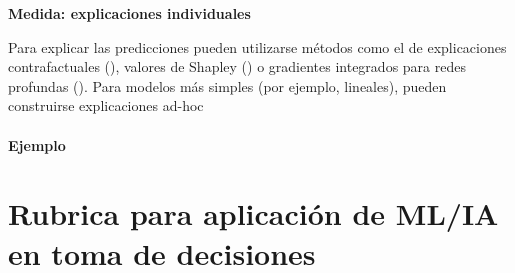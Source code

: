 \documentclass[
]{book}
\let\BeginKnitrBlock\begin \let\EndKnitrBlock\end
\begin{document}
\BeginKnitrBlock{rmdtip}
\textbf{Medida: explicaciones individuales}

Para explicar las predicciones pueden utilizarse métodos como el de explicaciones contrafactuales (\citep{wachter}),
valores de Shapley (\citep{shapley}) o gradientes integrados para redes profundas (\citep{gradient}).
Para modelos más simples (por ejemplo, lineales), pueden construirse explicaciones ad-hoc
\EndKnitrBlock{rmdtip}

\hypertarget{ejemplo-6}{%
\subsubsection*{Ejemplo}\label{ejemplo-6}}


\hypertarget{rubrica-para-aplicaciuxf3n-de-mlia-en-toma-de-decisiones}{%
\chapter{Rubrica para aplicación de ML/IA en toma de decisiones}\label{rubrica-para-aplicaciuxf3n-de-mlia-en-toma-de-decisiones}}

\backmatter
  
\end{document}
